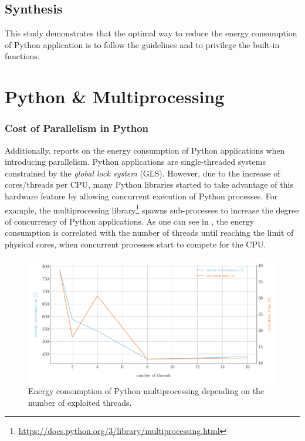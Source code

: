 \subsection{Synthesis}
This study demonstrates that the optimal way to reduce the energy consumption of Python application is to follow the guidelines and to privilege the built-in functions.


\section{Python \& Multiprocessing}


\subsubsection{Cost of Parallelism in Python}
Additionally,  reports on the energy consumption of Python applications when introducing parallelism.
Python applications are single-threaded systems constrained by the \emph{global lock system} (GLS).
However, due to the increase of cores/threads per CPU, many Python libraries started to take advantage of this hardware feature by allowing concurrent execution of Python processes.
For example, the multiprocessing library\footnote{\url{https://docs.python.org/3/library/multiprocessing.html}} spawns sub-processes to increase the degree of concurrency of Python applications.
As one can see in , the energy consumption is correlated with the number of threads until reaching the limit of physical cores, when concurrent processes start to compete for the CPU.

\begin{figure}[hbt]
    \centering
    \includegraphics[width=\linewidth]{imgs/multiprocessing_energyvstime}
    \caption{Energy consumption of Python multiprocessing depending on the number of exploited threads.}
    \label{fig:python_multiprocessing}
\end{figure}

